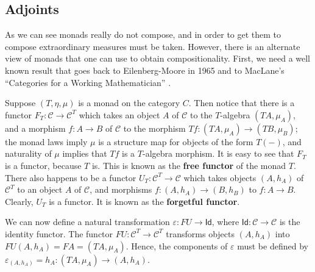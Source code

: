 \documentclass{article}
\let\mto\to
\let\to\relax
\newcommand{\to}{\rightarrow}
\newcommand{\cat}[1]{\mathcal{#1}}
\begin{document}
\subsection{Adjoints}
\label{subsec:adjoints}
As we can see monads really do not compose, and in order to get them
to compose extraordinary measures must be taken.  However, there is an
alternate view of monads that one can use to obtain compositionality.
First, we need a well known result that goes back to Eilenberg-Moore
in 1965 and to MacLane's ``Categories for a Working Mathematician''
\cite{MacLane:1971}.

Suppose $(T, \eta,\mu)$ is a monad on the category $C$.  Then notice
that there is a functor $F_T : \cat{C} \mto \cat{C}^T$ which takes an
object $A$ of $\cat{C}$ to the $T$-algebra $(TA,\mu_A)$, and a
morphism $f : A \mto B$ of $\cat{C}$ to the morphism $Tf : (TA, \mu_A)
\mto (TB,\mu_B)$; the monad laws imply $\mu$ is a structure map for
objects of the form $T(-)$, and naturality of $\mu$ implies that $Tf$
is a $T$-algebra morphism. It is easy to see that $F_T$ is a functor,
because $T$ is. This is known as the \textbf{free functor} of the
monad $T$.  There also happens to be a functor $U_T : \cat{C}^T \mto
\cat{C}$ which takes objects $(A,h_A)$ of $\cat{C}^T$ to an object $A$
of $\cat{C}$, and morphisms $f : (A,h_A) \mto (B,h_B)$ to $f : A \mto
B$.  Clearly, $U_T$ is a functor.  It is known as the
\textbf{forgetful functor}.

We can now define a natural transformation $\varepsilon : FU \mto
\mathsf{Id}$, where $\mathsf{Id} : \cat{C} \mto \cat{C}$ is the
identity functor.  The functor $FU : \cat{C}^T \mto \cat{C}^T$
transforms objects $(A,h_A)$ into $FU(A,h_A) = FA =
(TA,\mu_A)$. Hence, the components of $\varepsilon$ must be defined by
$\varepsilon_{(A,h_A)} = h_A : (TA, \mu_A) \mto (A, h_A)$.



 
\end{document}
